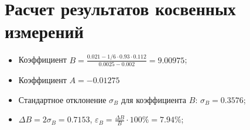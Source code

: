 \section{Расчет результатов косвенных измерений}
\begin{itemize}
    \item Коэффициент $B = \frac{0.021 - 1/6 \cdot 0.93 \cdot 0.112}{0.0025 - 0.002} = 9.00975$;
    \item Коэффициент $A = -0.01275$
    \item Стандартное отклонение $\sigma_B$ для коэффициента $B$: $\sigma_B = 0.3576$;
    \item $\Delta B = 2 \sigma_B = 0.7153$, $\varepsilon_B = \frac{\Delta B}{B} \cdot 100\% = 7.94\%$;
\end{itemize}
